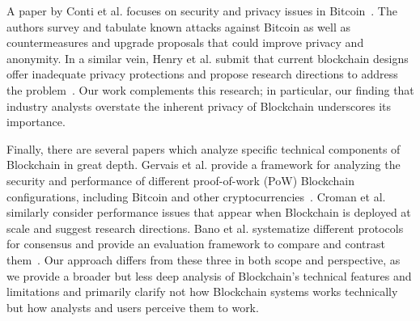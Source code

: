 A paper by Conti et al. focuses on security and privacy issues in Bitcoin~\cite{Conti17}. The authors survey and tabulate known attacks against Bitcoin as well as countermeasures and upgrade proposals that could improve privacy and anonymity. In a similar vein, Henry et al. submit that current blockchain designs offer inadequate privacy protections and propose research directions to address the problem~\cite{Henry18}. Our work complements this research; in particular, our finding that industry analysts overstate the inherent privacy of Blockchain underscores its importance. 

Finally, there are several papers which analyze specific technical components of Blockchain in great depth. Gervais et al. provide a framework for analyzing the security and performance of different proof-of-work (PoW) Blockchain configurations, including Bitcoin and other cryptocurrencies~\cite{Gervais16}. Croman et al. similarly consider performance issues that appear when Blockchain is deployed at scale and suggest research directions. Bano et al. systematize different protocols for consensus and provide an evaluation framework to compare and contrast them~\cite{Bano17}. %
Our approach differs from these three in both scope and perspective, as we provide a broader but less deep analysis of Blockchain's technical features and limitations and primarily clarify not how Blockchain systems works technically but how analysts and users perceive them to work.